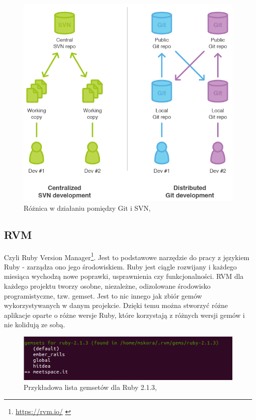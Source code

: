   \begin{figure}
    \centering
    \includegraphics[scale=0.45]{images/gitsvn.png}
    \caption{Różnica w działaniu pomiędzy Git i SVN, \cite{git}}
  \end{figure}

  \subsection{RVM}
   \label{sec:RVM}
  Czyli Ruby Version Manager\footnote{\url{https://rvm.io/} \cite{programming_ruby}}. Jest to podstawowe narzędzie do pracy z językiem Ruby - zarządza ono jego środowiskiem. Ruby jest ciągle rozwijany i każdego miesiąca wychodzą nowe poprawki, usprawnienia czy funkcjonalności. RVM dla każdego projektu tworzy osobne, niezależne, odizolowane środowisko programistyczne, tzw. gemset. Jest to nic innego jak zbiór gemów wykorzystywanych w danym projekcie. Dzięki temu można stworzyć różne aplikacje oparte o różne wersje Ruby, które korzystają z różnych wersji gemów i nie kolidują ze sobą.
  \begin{figure}[h]
  \centering
  \includegraphics[scale=0.84]{images/rvm.png}
  \caption{Przykładowa lista gemsetów dla Ruby 2.1.3, \cite{rubydoc}}
  \end{figure}

